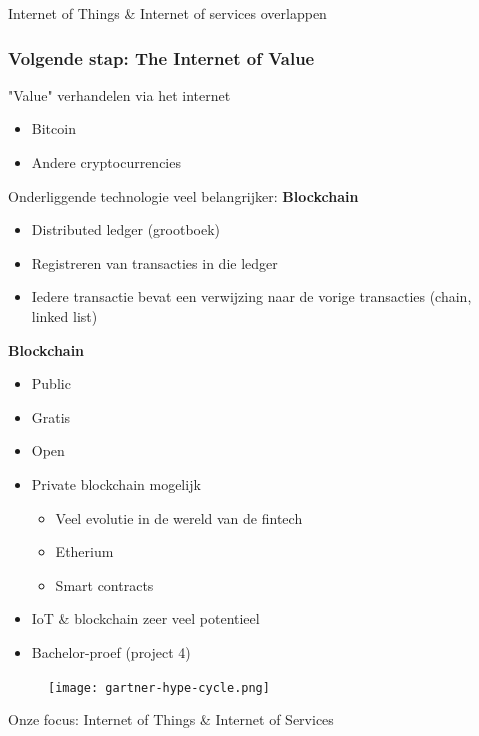 \documentclass{article}
\newcommand{\bold}[1]{\textbf{#1}}
\begin{document}
Internet of Things \& Internet of services overlappen

\subsubsection{Volgende stap: The Internet of Value}

"Value" verhandelen via het internet

\begin{itemize}
    \item Bitcoin
    \item Andere cryptocurrencies
\end{itemize}

Onderliggende technologie veel belangrijker: \bold{Blockchain}

\begin{itemize}
    \item Distributed ledger (grootboek)
    \item Registreren van transacties in die ledger
    \item Iedere transactie bevat een verwijzing naar de vorige transacties (chain, linked list)
\end{itemize}

\bold{Blockchain}
\begin{itemize}
    \item Public
    \item Gratis
    \item Open
\end{itemize}

\begin{itemize}
    \item Private blockchain mogelijk
    \begin{itemize}
        \item Veel evolutie in de wereld van de fintech
        \item Etherium
        \item Smart contracts
    \end{itemize}
    \item IoT \& blockchain zeer veel potentieel
    \item Bachelor-proef (project 4)
\end{itemize}

\begin{figure}[H]
    \centering
    \texttt{[image: gartner-hype-cycle.png]}
    \caption{}
\end{figure}

Onze focus: Internet of Things \& Internet of Services
\end{document}
